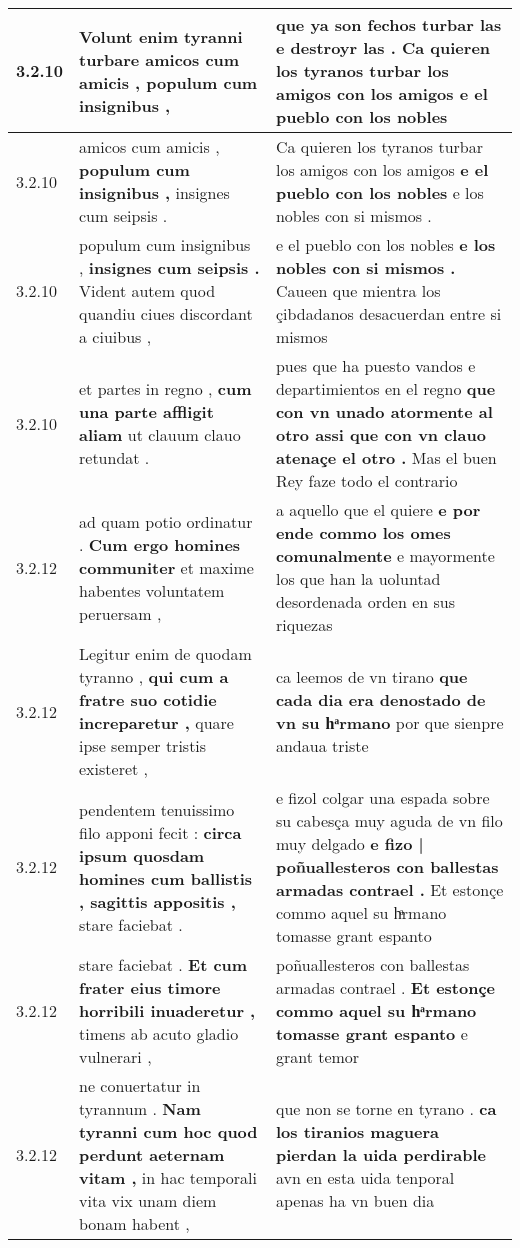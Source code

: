 \begin{tabular}{|p{1cm}|p{6.5cm}|p{6.5cm}|}
3.2.10 & Volunt enim tyranni turbare \textbf{ amicos cum amicis , } populum cum insignibus , & que ya son fechos turbar las e destroyr las . \textbf{ Ca quieren los tyranos turbar los amigos con los amigos } e el pueblo con los nobles \\\hline
3.2.10 & amicos cum amicis , \textbf{ populum cum insignibus , } insignes cum seipsis . & Ca quieren los tyranos turbar los amigos con los amigos \textbf{ e el pueblo con los nobles } e los nobles con si mismos . \\\hline
3.2.10 & populum cum insignibus , \textbf{ insignes cum seipsis . } Vident autem quod quandiu ciues discordant a ciuibus , & e el pueblo con los nobles \textbf{ e los nobles con si mismos . } Caueen que mientra los çibdadanos desacuerdan entre si mismos \\\hline
3.2.10 & et partes in regno , \textbf{ cum una parte affligit aliam } ut clauum clauo retundat . & pues que ha puesto vandos e departimientos en el regno \textbf{ que con vn unado atormente al otro assi que con vn clauo atenaçe el otro . } Mas el buen Rey faze todo el contrario \\\hline
3.2.12 & ad quam potio ordinatur . \textbf{ Cum ergo homines communiter } et maxime habentes voluntatem peruersam , & a aquello que el quiere \textbf{ e por ende commo los omes comunalmente } e mayormente los que han la uoluntad desordenada orden en sus riquezas \\\hline
3.2.12 & Legitur enim de quodam tyranno , \textbf{ qui cum a fratre suo cotidie increparetur , } quare ipse semper tristis existeret , & ca leemos de vn tirano \textbf{ que cada dia era denostado de vn su hͣrmano } por que sienpre andaua triste \\\hline
3.2.12 & pendentem tenuissimo filo apponi fecit : \textbf{ circa ipsum quosdam homines cum ballistis , sagittis appositis , } stare faciebat . & e fizol colgar una espada sobre su cabesça muy aguda de vn filo muy delgado \textbf{ e fizo | poñuallesteros con ballestas armadas contrael . } Et estonçe commo aquel su hͣrmano tomasse grant espanto \\\hline
3.2.12 & stare faciebat . \textbf{ Et cum frater eius timore horribili inuaderetur , } timens ab acuto gladio vulnerari , & poñuallesteros con ballestas armadas contrael . \textbf{ Et estonçe commo aquel su hͣrmano tomasse grant espanto } e grant temor \\\hline
3.2.12 & ne conuertatur in tyrannum . \textbf{ Nam tyranni cum hoc quod perdunt aeternam vitam , } in hac temporali vita vix unam diem bonam habent , & que non se torne en tyrano . \textbf{ ca los tiranios maguera pierdan la uida perdirable } avn en esta uida tenporal apenas ha vn buen dia \\\hline

\end{tabular}
